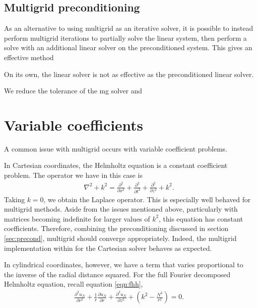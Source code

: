 

\subsection{Multigrid preconditioning}

As an alternative to using multigrid as an iterative solver, it is possible to instead perform multigrid iterations to partially solve the linear system, then perform a solve with an additional linear solver on the preconditioned system.
This gives an effective method  

On its own, the linear solver is not as effective as the preconditioned linear solver.



We reduce the tolerance of the mg solver and 





\section{Variable coefficients}

A common issue with multigrid occurs with variable coefficient problems.
\cite{briggs}

In Cartesian coordinates, the Helmholtz equation is a constant coefficient problem.
The operator we have in this case is
\begin{align}
	\nabla^2 + k^2 = \frac{\partial^2}{\partial x^2} + \frac{\partial^2}{\partial t^2} + \frac{\partial^2}{\partial z^2} + k^2.
\end{align}
Taking $k=0$, we obtain the Laplace operator.
This is especially well behaved for multigrid methods.
Aside from the issues mentioned above, particularly with matrices becoming indefinite for larger values of $k^2$, this equation has constant coefficients.
Therefore, combining the preconditioning discussed in section \ref{sec:precond}, multigrid should converge appropriately.
Indeed, the multigrid implementation within \oomph for the Cartesian solver behaves as expected.

In cylindrical coordinates, however, we have a term that varies proportional to the inverse of the radial distance squared.
For the full Fourier decomposed Helmholtz equation, recall equation \eqref{eqn:fhh},
\begin{align}
	\frac{\partial^2 u_N}{\partial r^2}
			 + \frac{1}{r} \frac{\partial u_N}{\partial r}
			 + \frac{\partial^2 u_N}{\partial z^2}
			 + (k^2 - \frac{N^2}{r^2}) = 0. \label{eqn:full_fhh}
\end{align}

